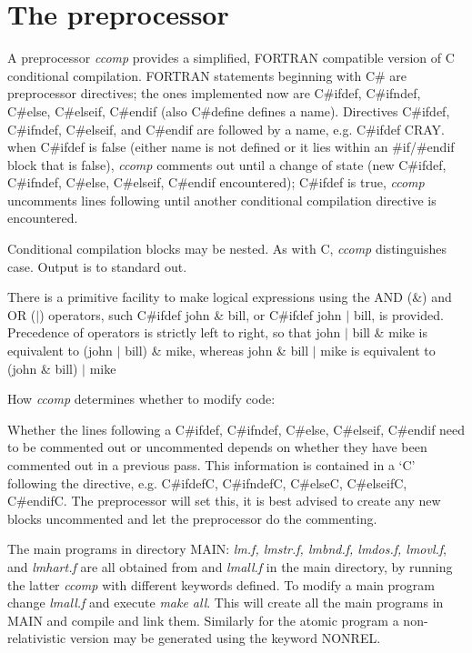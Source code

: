 \documentclass[aps,twocolumn,a4]{revtex4}
\begin{document}
\appendix
%
\section{The preprocessor}
\label{prepro}

A preprocessor {\em ccomp}
provides a simplified, FORTRAN compatible version
of C conditional compilation.  FORTRAN statements beginning with C\# are
preprocessor directives; the ones implemented now are C\#ifdef,
C\#ifndef, C\#else, C\#elseif, C\#endif (also C\#define defines a name).
Directives C\#ifdef, C\#ifndef, C\#elseif, and C\#endif are followed by
a name, e.g.  C\#ifdef CRAY. when C\#ifdef is false (either name is not
defined or it lies within an \#if/\#endif block that is false),
{\em ccomp}
comments out until a change of state (new C\#ifdef, C\#ifndef, C\#else,
C\#elseif, C\#endif encountered); C\#ifdef is true, {\em ccomp}
uncomments
lines following until another conditional compilation directive is
encountered.

Conditional compilation blocks may be nested.  As with C, {\em ccomp}
distinguishes case.  Output is to standard out.

There is a primitive facility to make logical expressions using the AND
(\&) and OR ($|$) operators, such C\#ifdef john \& bill, or C\#ifdef
john $|$ bill, is provided.  Precedence of operators is strictly left to
right, so that john $|$ bill \& mike is equivalent to (john $|$ bill) \&
mike, whereas john \& bill $|$ mike is equivalent to (john \& bill) $|$
mike

How {\em ccomp} determines whether to modify code:

Whether the lines following a C\#ifdef, C\#ifndef, C\#else, C\#elseif,
C\#endif need to be commented out or uncommented depends on whether they
have been commented out in a previous pass.  This information is
contained in a `C' following the directive, e.g.  C\#ifdefC, C\#ifndefC,
C\#elseC, C\#elseifC, C\#endifC.  The preprocessor will set this, it is
best advised to create any new blocks uncommented and let the
preprocessor do the commenting.

The main programs in directory MAIN: {\em lm.f, lmstr.f, lmbnd.f,
lmdos.f, lmovl.f}, and {\em lmhart.f} are all obtained from
and {\em lmall.f} in the main directory, by running the latter
{\em ccomp} with different
keywords defined.  To modify a main program change {\em lmall.f} and
execute {\em make all}.  This will create all the main programs in MAIN
and compile and link them.  Similarly for the atomic program a
non-relativistic version may be generated using the keyword NONREL.
\end{document}
